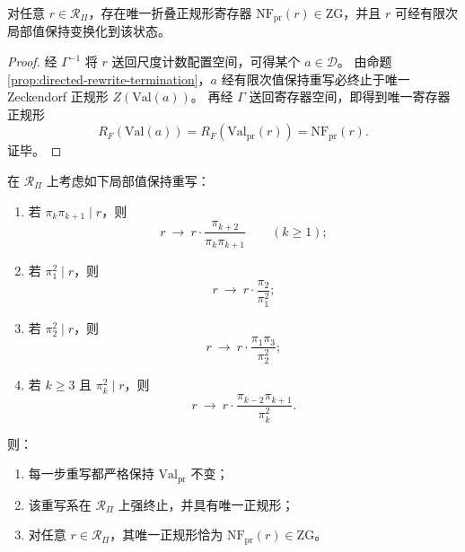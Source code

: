 \begin{proposition}[寄存器正规形的存在唯一性]\label{prop:prime-register-normal-form-uniqueness}
对任意 \(r\in\mathcal R_{\Pi}\)，存在唯一折叠正规形寄存器 \(\mathrm{NF}_{\mathrm{pr}}(r)\in \mathrm{ZG}\)，并且 \(r\) 可经有限次局部值保持变换化到该状态。
\end{proposition}

\begin{proof}
经 \(\Gamma^{-1}\) 将 \(r\) 送回尺度计数配置空间，可得某个 \(a\in\mathcal D\)。
由命题 \ref{prop:directed-rewrite-termination}，\(a\) 经有限次值保持重写必终止于唯一 Zeckendorf 正规形 \(Z(\mathrm{Val}(a))\)。
再经 \(\Gamma\) 送回寄存器空间，即得到唯一寄存器正规形
\[
R_F(\mathrm{Val}(a))=R_F(\mathrm{Val}_{\mathrm{pr}}(r))=\mathrm{NF}_{\mathrm{pr}}(r).
\]
证毕。
\end{proof}

\begin{proposition}\label{prop:prime-register-rewrite-confluent-normal-form}
在 \(\mathcal R_{\Pi}\) 上考虑如下局部值保持重写：
\begin{enumerate}
  \item 若 \(\pi_k\pi_{k+1}\mid r\)，则
  \[
  r\ \longrightarrow\ r\cdot \frac{\pi_{k+2}}{\pi_k\pi_{k+1}}
  \qquad(k\ge1);
  \]
  \item 若 \(\pi_1^2\mid r\)，则
  \[
  r\ \longrightarrow\ r\cdot \frac{\pi_2}{\pi_1^2};
  \]
  \item 若 \(\pi_2^2\mid r\)，则
  \[
  r\ \longrightarrow\ r\cdot \frac{\pi_1\pi_3}{\pi_2^2};
  \]
  \item 若 \(k\ge3\) 且 \(\pi_k^2\mid r\)，则
  \[
  r\ \longrightarrow\ r\cdot \frac{\pi_{k-2}\pi_{k+1}}{\pi_k^2}.
  \]
\end{enumerate}
则：
\begin{enumerate}
  \item 每一步重写都严格保持 \(\mathrm{Val}_{\mathrm{pr}}\) 不变；
  \item 该重写系在 \(\mathcal R_{\Pi}\) 上强终止，并具有唯一正规形；
  \item 对任意 \(r\in\mathcal R_{\Pi}\)，其唯一正规形恰为 \(\mathrm{NF}_{\mathrm{pr}}(r)\in\mathrm{ZG}\)。
\end{enumerate}
\end{proposition}

